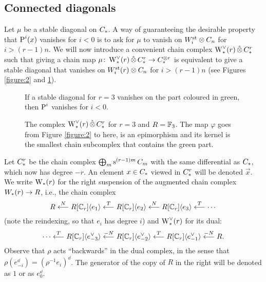 \subsection{Connected diagonals}\label{s:connected}

Let $\mu$ be a stable diagonal on $\ucadenas$.
A way of guaranteeing the desirable property that $\power^i(x)$ vanishes for $i<0$ is to ask for $\mu$ to vanish on $\Wst[i] \ot \ucadenas[n]$ for $i>(r-1)n$.
We will now introduce a convenient chain complex $\rWd(r) \hotimes \rucadenas$ such that giving a chain map $\mu \colon \rWd(r)  \hotimes \rucadenas \to \ucadenas^{\ot r}$ is equivalent to give a stable diagonal that vanishes on $\Wst[i](r) \ot \ucadenas[n]$ for $i>(r-1)n$ (see Figures \ref{figure:2} and \ref{figure:3}).

\begin{figure}
	
	\caption{If a stable diagonal for $r=3$ vanishes on the part coloured in green, then $\power^i$ vanishes for $i<0$.}
	\label{figure:2}

	
	\caption{The complex $\rWd(r) \hotimes \rucadenas$ for $r=3$ and $R=\bF_3$.
		The map $\varphi$ goes from Figure \ref{figure:2} to here, is an epimorphism and its kernel is the smallest chain subcomplex that contains the green part.}
	\label{figure:3}
\end{figure}

Let $\rucadenas$ be the chain complex $\bigoplus_m \sus{(r-1)m}\ucadenas[m]$ with the same differential as $\ucadenas$, which now has degree $-r$.
An element $x\in \ucadenas$ viewed in $\rucadenas$ will be denoted $\vec{x}$.
We write $\rW(r)$ for the right suspension of the augmented chain complex $\W(r) \to R$, i.e., the chain complex
\[
R
\overset{N}{\lla}
R[\Cyc_r]\langle e_{1}\rangle
\overset{T}{\lla}
R[\Cyc_r]\langle e_{2}\rangle
\overset{N}{\lla}
R[\Cyc_r]\langle e_{3}\rangle
\overset{T}{\lla}
\dotsb
\]
(note the reindexing, so that $e_i$ has degree $i$) and $\rWd(r)$ for its dual:
\[
\dotsb
\overset{T}{\lla} 
R[\Cyc_r]\langle e_{-3}^\dd\rangle 
\overset{-N}{\lla}
R[\Cyc_r]\langle e_{-2}^\dd\rangle 
\overset{T}{\lla} 
R[\Cyc_r]\langle e_{-1}^\dd\rangle 
\overset{-N}{\lla} 
R.
\]
Observe that $\rho$ acts ``backwards'' in the dual complex, in the sense that $\rho (e_{-i}^\dd) = (\rho^{-1} e_i)^{\dd}$.
The generator of the copy of $R$ in the right will be denoted as $1$ or as $e_0^\dd$.

